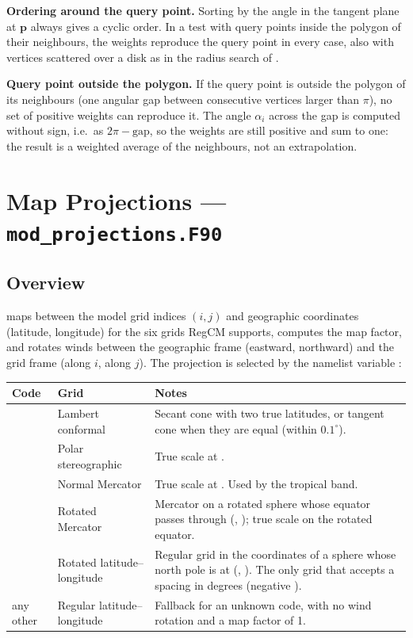 \textbf{Ordering around the query point.} Sorting by the angle in the
tangent plane at $\mathbf{p}$ always gives a cyclic order. In a test with
query points inside the polygon of their neighbours, the weights
reproduce the query point in every case, also with vertices scattered over
a disk as in the radius search of .

\textbf{Query point outside the polygon.} If the query point is outside
the polygon of its neighbours (one angular gap between consecutive vertices
larger than $\pi$), no set of positive weights can reproduce it. The angle
$\alpha_i$ across the gap is computed without sign, i.e.\ as
$2\pi - \text{gap}$, so the weights are still positive and sum to one: the
result is a weighted average of the neighbours, not an extrapolation.

\section{Map Projections --- \texttt{mod\_projections.F90}}
\label{sec:projections}

\subsection{Overview}

 maps between the model grid indices $(i, j)$ and
geographic coordinates (latitude, longitude) for the six grids RegCM
supports, computes the map factor, and rotates winds between the
geographic frame (eastward, northward) and the grid frame (along $i$, along
$j$). The projection is selected by the namelist variable :

\begin{longtable}{L{2cm} L{4cm} L{8cm}}
  \toprule
  \textbf{Code} & \textbf{Grid} & \textbf{Notes} \\
  \midrule
  \endhead
  \bottomrule
  \endfoot
   & Lambert conformal &
    Secant cone with two true latitudes, or tangent cone when they are
    equal (within $0.1^\circ$). \\
   & Polar stereographic &
    True scale at . \\
   & Normal Mercator &
    True scale at . Used by the tropical band. \\
   & Rotated Mercator &
    Mercator on a rotated sphere whose equator passes through
    (, ); true scale on the rotated equator. \\
   & Rotated latitude--longitude &
    Regular grid in the coordinates of a sphere whose north pole is at
    (, ). The only grid that accepts a spacing in
    degrees (negative ). \\
  any other & Regular latitude--longitude &
    Fallback for an unknown code, with no wind rotation and a map factor
    of 1. \\
\end{longtable}

